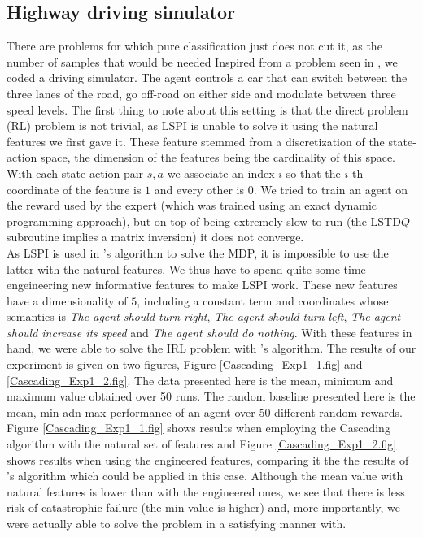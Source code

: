 \documentclass{article} %
\newcommand{\0}{\mathbf{0}}
\newcommand{\1}{\mathbf{1}}
\begin{document}
\subsection{Highway driving simulator}
There are problems for which pure classification just does not cut it, as the number of samples that would be needed 
Inspired from a problem seen in \cite{syed2008apprenticeship,syed2008game}, we coded a driving simulator. The agent controls a car that can switch between the three lanes of the road, go off-road on either side and modulate between three speed levels. The first thing to note about this setting is that the direct problem (RL) problem is not trivial, as LSPI is unable to solve it using the natural features we first gave it. These feature stemmed from a discretization of the state-action space, the dimension of the features being the cardinality of this space. With each state-action pair $s,a$ we associate an index $i$ so that the $i$-th coordinate of the feature is $1$ and every other is $0$. We tried to train an agent on the reward used by the expert (which was trained using an exact dynamic programming approach), but on top of being extremely slow to run (the LSTD$Q$ subroutine implies a matrix inversion) it does not converge.\\
As LSPI is used in \cite{abbeel2004apprenticeship}'s algorithm to solve the MDP, it is impossible to use the latter with the natural features. We thus have to spend quite some time engeineering new informative features to make LSPI work. These new features have a dimensionality of $5$, including a constant term and coordinates whose semantics is \emph{The agent should turn right}, \emph{The agent should turn left}, \emph{The agent should increase its speed} and \emph{The agent should do nothing}. With these features in hand, we were able to solve the IRL problem with \cite{abbeel2004apprenticeship}'s algorithm. The results of our experiment is given on two figures, Figure \ref{Cascading_Exp1_1.fig} and \ref{Cascading_Exp1_2.fig}. The data presented here is the mean, minimum and maximum value obtained over 50 runs. The random baseline presented here is the mean, min adn max performance of an agent over 50 different random rewards.\\
Figure \ref{Cascading_Exp1_1.fig} shows results when employing the Cascading algorithm with the natural set of features and Figure \ref{Cascading_Exp1_2.fig} shows results when using the engineered features, comparing it the the results of \cite{abbeel2004apprenticeship}'s algorithm which could be applied in this case. Although the mean value with natural features is lower than with the engineered ones, we see that there is less risk of catastrophic failure (the min value is higher) and, more importantly, we were actually able to solve the problem in a satisfying manner with.
\end{document}
